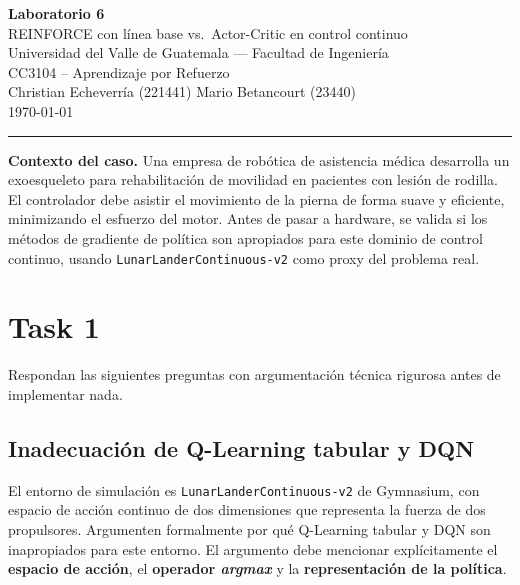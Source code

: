 \documentclass[11pt,letterpaper]{article}
\newcommand{\lead}[1]{\textbf{#1}}
\begin{document}
\begin{center}
  {\Large\bfseries\color{uvgverde} Laboratorio 6}\\[4pt]
  {\large REINFORCE con línea base vs.\ Actor-Critic en control continuo}\\[6pt]
  {\small Universidad del Valle de Guatemala --- Facultad de Ingeniería}\\[2pt]
  {\small CC3104 -- Aprendizaje por Refuerzo}\\[6pt]
  {\small Christian Echeverría (221441) \quad\textbullet\quad Mario Betancourt (23440)}\\[2pt]
  {\small \today}
\end{center}
\vspace{0.6em}
\hrule
\vspace{1.2em}

\begin{observacion}
\lead{Contexto del caso.} Una empresa de robótica de asistencia médica desarrolla un
exoesqueleto para rehabilitación de movilidad en pacientes con lesión de rodilla. El
controlador debe asistir el movimiento de la pierna de forma suave y eficiente,
minimizando el esfuerzo del motor. Antes de pasar a hardware, se valida si los métodos
de gradiente de política son apropiados para este dominio de control continuo, usando
\texttt{LunarLanderContinuous-v2} como proxy del problema real.
\end{observacion}

\section{Task 1}

\begin{enunciado}
Respondan las siguientes preguntas con argumentación técnica rigurosa antes de
implementar nada.
\end{enunciado}

\subsection{Inadecuación de Q-Learning tabular y DQN}

\begin{enunciado}
El entorno de simulación es \texttt{LunarLanderContinuous-v2} de Gymnasium, con espacio
de acción continuo de dos dimensiones que representa la fuerza de dos propulsores.
Argumenten formalmente por qué Q-Learning tabular y DQN son inapropiados para este
entorno. El argumento debe mencionar explícitamente el \textbf{espacio de acción}, el
\textbf{operador \textit{argmax}} y la \textbf{representación de la política}.
\end{enunciado}
\end{document}
